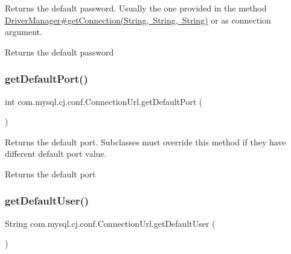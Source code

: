 Returns the default password. Usually the one provided in the method \mbox{\hyperlink{}{Driver\+Manager\#get\+Connection(\+String, String, String)}} or as connection argument.

\begin{DoxyReturn}{Returns}
the default password 
\end{DoxyReturn}
\mbox{\label{classcom_1_1mysql_1_1cj_1_1conf_1_1_connection_url_ae02cd435e2ee29c886621ef728162a4b}} 
\subsubsection{\texorpdfstring{get\+Default\+Port()}{getDefaultPort()}}
{\footnotesize\ttfamily int com.\+mysql.\+cj.\+conf.\+Connection\+Url.\+get\+Default\+Port (\begin{DoxyParamCaption}{ }\end{DoxyParamCaption})}

Returns the default port. Subclasses must override this method if they have different default port value.

\begin{DoxyReturn}{Returns}
the default port 
\end{DoxyReturn}
\mbox{\label{classcom_1_1mysql_1_1cj_1_1conf_1_1_connection_url_a9c7c39c11e822c5d253069e4c95c9fba}} 
\subsubsection{\texorpdfstring{get\+Default\+User()}{getDefaultUser()}}
{\footnotesize\ttfamily String com.\+mysql.\+cj.\+conf.\+Connection\+Url.\+get\+Default\+User (\begin{DoxyParamCaption}{ }\end{DoxyParamCaption})}

